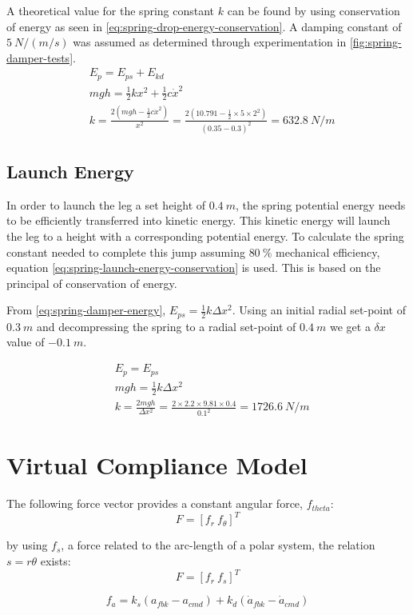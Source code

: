 A theoretical value for the spring constant $k$ can be found by using conservation of energy as seen in \cref{eq:spring-drop-energy-conservation}. A damping constant of $5\ N/(m/s)$ was assumed as determined through experimentation in \cref{fig:spring-damper-tests}.
\begin{equation} \label{eq:spring-drop-energy-conservation}
\begin{aligned}
&E_p = E_{ps} + E_{kd} \\
&mgh = \frac{1}{2}kx^2 + \frac{1}{2}c\dot{x}^2\\
&k = \frac{2(mgh - \frac{1}{2}c\dot{x}^2)}{x^2} = \frac{2(10.791 - \frac{1}{2}\times 5\times 2^2)}{(0.35-0.3)^2} = 632.8\ N/m
\end{aligned}
\end{equation}

\subsection{Launch Energy}
In order to launch the leg a set height of $0.4\ m$, the spring potential energy needs to be efficiently transferred into kinetic energy. This kinetic energy will launch the leg to a height with a corresponding potential energy. To calculate the spring constant needed to complete this jump assuming $80\ \%$ mechanical efficiency, equation \cref{eq:spring-launch-energy-conservation} is used. This is based on the principal of conservation of energy.

From \cref{eq:spring-damper-energy}, $E_{ps} = \frac{1}{2}k\Delta x^2$. Using an initial radial set-point of $0.3\ m$ and decompressing the spring to a radial set-point of $0.4\ m$ we get a $\delta x$ value of $-0.1\ m$.

\begin{equation} \label{eq:spring-launch-energy-conservation}
\begin{aligned}
&E_p = E_{ps} \\
&mgh = \frac{1}{2}k \Delta x^2 \\
&k = \frac{2mgh}{\Delta x^2} = \frac{2\times 2.2 \times 9.81 \times 0.4}{0.1^2} = 1726.6\ N/m
\end{aligned}
\end{equation}

\section{Virtual Compliance Model}

The following force vector provides a constant angular force, $f_{theta}$:
\begin{equation}
F = [f_r\ f_{\theta}]^T
\end{equation}

by using $f_{s}$, a force related to the arc-length of a polar system, the relation $s = r \theta$ exists:
\begin{equation}
F = [f_r\ f_{s}]^T
\end{equation}

\begin{equation}
f_a = k_s(a_{fbk} - a_{cmd}) + k_d(\dot{a}_{fbk} - \dot{a}_{cmd})
\end{equation}